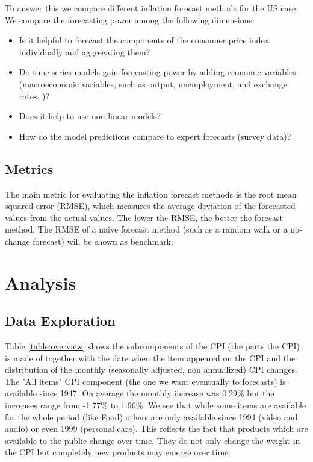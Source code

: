 \documentclass[12pt]{article}
\begin{document}
To answer this we compare different inflation forecast methods for the US case. We compare the forecasting power among the following dimensions: 
\begin{itemize}
\item Is it helpful to forecast the components of the consumer price index individually and aggregating them?
\item Do time series models gain forecasting power by adding economic variables (macroeconomic variables, such as output, unemployment, and exchange rates. )?
\item Does it help to use non-linear models?
\item How do the model predictions compare to expert forecasts (survey data)?
\end{itemize}

\subsection{Metrics}
The main metric for evaluating the inflation forecast methods is the root mean squared error (RMSE), which measures the average deviation of the forecasted values from the actual values. The lower the RMSE, the better the forecast method.
The RMSE of a naive forecast method (such as a random walk or a no-change forecast) will be shown as benchmark.

\section{Analysis}
\subsection{Data Exploration}

Table \ref{table:overview} shows the subcomponents of the CPI (the parts the CPI) is made of together with the date when the item appeared on the CPI and the distribution of the monthly (seasonally adjusted, non annualized) CPI changes. 
The "All items" CPI component  (the one we want eventually to forecasts) is available since 1947. On average the monthly increase was 0.29\% but the increases range from -1.77\% to 1.96\%.
We see that while some items are available for the whole period (like Food) others are only available since 1994 (video and audio) or even 1999 (personal care). This reflects the fact that products which are available to the public change over time. They do not only change the weight in the CPI but completely new products may emerge over time. 
\end{document}
